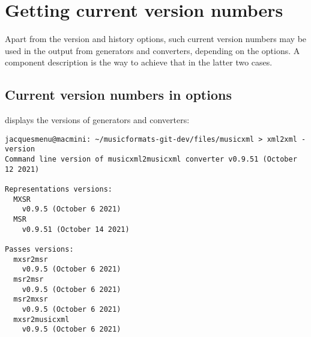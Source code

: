 \section{Getting current version numbers}\label{Getting current version numbers}

Apart from the version and history options, such current version numbers may be used in the output from generators and converters, depending on the options. A component description is the way to achieve that in the latter two cases.


\subsection{Current version numbers in options}\label{Current version numbers in options}

 displays the versions of generators and converters:
\begin{lstlisting}[language=Terminal]
jacquesmenu@macmini: ~/musicformats-git-dev/files/musicxml > xml2xml -version
Command line version of musicxml2musicxml converter v0.9.51 (October 12 2021)

Representations versions:
  MXSR
    v0.9.5 (October 6 2021)
  MSR
    v0.9.51 (October 14 2021)

Passes versions:
  mxsr2msr
    v0.9.5 (October 6 2021)
  msr2msr
    v0.9.5 (October 6 2021)
  msr2mxsr
    v0.9.5 (October 6 2021)
  mxsr2musicxml
    v0.9.5 (October 6 2021)
\end{lstlisting}

